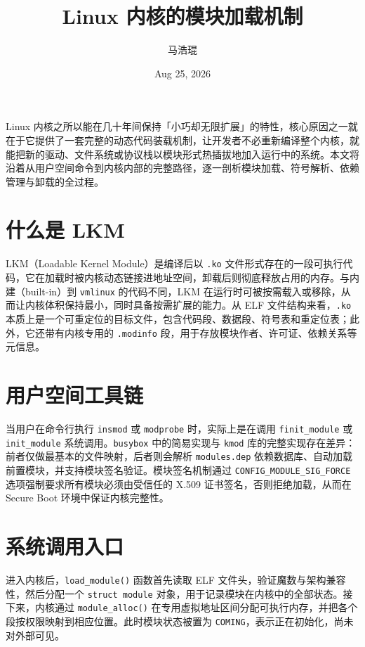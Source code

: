 \title{Linux 内核的模块加载机制}
\author{马浩琨}
\date{Aug 25, 2026}
\maketitle
Linux 内核之所以能在几十年间保持「小巧却无限扩展」的特性，核心原因之一就在于它提供了一套完整的动态代码装载机制，让开发者不必重新编译整个内核，就能把新的驱动、文件系统或协议栈以模块形式热插拔地加入运行中的系统。本文将沿着从用户空间命令到内核内部的完整路径，逐一剖析模块加载、符号解析、依赖管理与卸载的全过程。\par
\chapter{什么是 LKM}
LKM（Loadable Kernel Module）是编译后以 \texttt{.ko} 文件形式存在的一段可执行代码，它在加载时被内核动态链接进地址空间，卸载后则彻底释放占用的内存。与内建（built-in）到 \texttt{vmlinux} 的代码不同，LKM 在运行时可被按需载入或移除，从而让内核体积保持最小，同时具备按需扩展的能力。从 ELF 文件结构来看，\texttt{.ko} 本质上是一个可重定位的目标文件，包含代码段、数据段、符号表和重定位表；此外，它还带有内核专用的 \texttt{.modinfo} 段，用于存放模块作者、许可证、依赖关系等元信息。\par
\chapter{用户空间工具链}
当用户在命令行执行 \texttt{insmod} 或 \texttt{modprobe} 时，实际上是在调用 \texttt{finit\_{}module} 或 \texttt{init\_{}module} 系统调用。\texttt{busybox} 中的简易实现与 \texttt{kmod} 库的完整实现存在差异：前者仅做最基本的文件映射，后者则会解析 \texttt{modules.dep} 依赖数据库、自动加载前置模块，并支持模块签名验证。模块签名机制通过 \texttt{CONFIG\_{}MODULE\_{}SIG\_{}FORCE} 选项强制要求所有模块必须由受信任的 X.509 证书签名，否则拒绝加载，从而在 Secure Boot 环境中保证内核完整性。\par
\chapter{系统调用入口}
进入内核后，\texttt{load\_{}module()} 函数首先读取 ELF 文件头，验证魔数与架构兼容性，然后分配一个 \texttt{struct module} 对象，用于记录模块在内核中的全部状态。接下来，内核通过 \texttt{module\_{}alloc()} 在专用虚拟地址区间分配可执行内存，并把各个段按权限映射到相应位置。此时模块状态被置为 \texttt{COMING}，表示正在初始化，尚未对外部可见。\par
